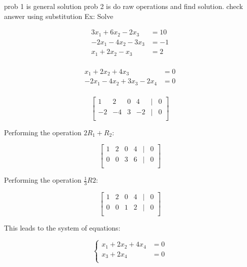 \documentclass{article}
\begin{document}
\medskip
prob 1 is general solution
\medskip
prob 2 is do raw operations and find solution. check answer using substitution
\medskip
\newline
Ex: Solve 

\begin{equation}
    \begin{aligned}
        3x_1 + 6x_2 - 2x_3 &= 10 \\
        -2x_1 - 4x_2 - 3x_3 &= -1 \\
        x_1 + 2x_2 - x_3 &= 2 \\
    \end{aligned}
\end{equation}




\begin{equation}
    \begin{aligned}
    x_1 + 2x_2 + 4x_3 & = 0 \\
    -2x_1 - 4x_2 + 3x_3 - 2x_4 & = 0 \\
    \end{aligned}
\end{equation}

\[
\begin{bmatrix}
    1 & 2 & 0 & 4 & | & 0 \\
    -2 & -4 & 3 & -2 & | & 0 \\
\end{bmatrix}
\]

Performing the operation \(2R_1 + R_2\):

\[
\begin{bmatrix}
    1 & 2 & 0 & 4 & | & 0 \\
    0 & 0 & 3 & 6 & | & 0 \\
\end{bmatrix}
\]

Performing the operation \(\frac{1}{3}R2\):

\[
\begin{bmatrix}
    1 & 2 & 0 & 4 & | & 0 \\
    0 & 0 & 1 & 2 & | & 0 \\
\end{bmatrix}
\]

This leads to the system of equations:

\[
\begin{cases}
    x_1 + 2x_2 + 4x_4 &= 0 \\
    x_3 + 2x_4 &= 0 \\
\end{cases}
\]
\end{document}
